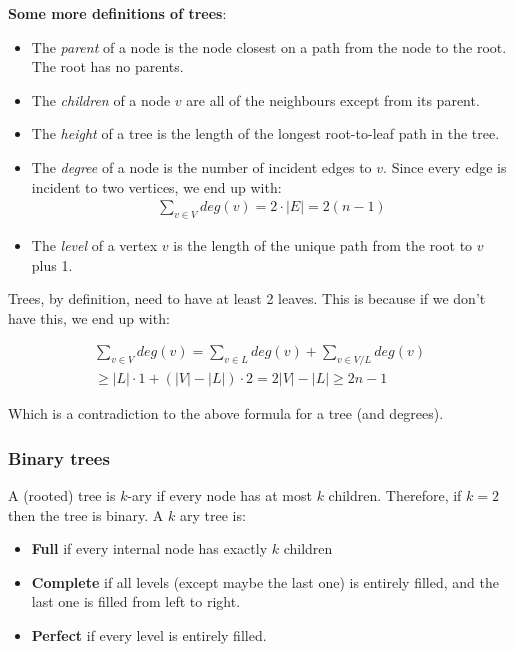 \documentclass[11pt,a4paper,titlepage,dvipsnames,cmyk]{scrartcl}
\begin{document}
\textbf{Some more definitions of trees}:
\begin{itemize}
    \item The \textit{parent} of a node is the node closest on a path from
        the node to the root. The root has no parents.
    \item The \textit{children} of a node $v$ are all of the neighbours
        except from its parent.
    \item The \textit{height} of a tree is the length of the longest
        root-to-leaf path in the tree.
    \item The \textit{degree} of a node is the number of incident edges to
        $v$. Since every edge is incident to two vertices, we end up with:
\begin{align*}
    \sum_{v \in V} deg(v) = 2\cdot |E| = 2(n-1)
\end{align*}
    \item The \textit{level} of a vertex $v$ is the length of the unique
        path from the root to $v$ plus 1.
\end{itemize}

Trees, by definition, need to have at least 2 leaves. This is because if
we don't have this, we end up with:

\begin{align*}
    \sum_{v \in V} deg(v)= \sum_{v \in L} deg(v) + \sum_{v \in V / L}
    deg(v) \\
    \ge |L| \cdot 1 + (|V| - |L|) \cdot 2 = 2|V| - |L| \ge 2n-1
\end{align*}

Which is a contradiction to the above formula for a tree (and degrees).

\subsubsection{Binary trees}%
\label{ssub:Binary trees}
\begin{tcolorbox} [space to upper,
        collower=white,
        title={Binary trees definition},
        nobeforeafter,
        halign lower=flush right, ]
A (rooted) tree is $k$-ary if every node has at most $k$ children.
Therefore, if $k=2$ then the tree is binary. A $k$ ary tree is:
\begin{itemize}
    \item \textbf{Full} if every internal node has exactly $k$ children
    \item \textbf{Complete} if all levels (except maybe the last one) is
        entirely filled, and the last one is filled from left to right.
    \item \textbf{Perfect} if every level is entirely filled.
\end{itemize}
\end{tcolorbox}
\end{document}
